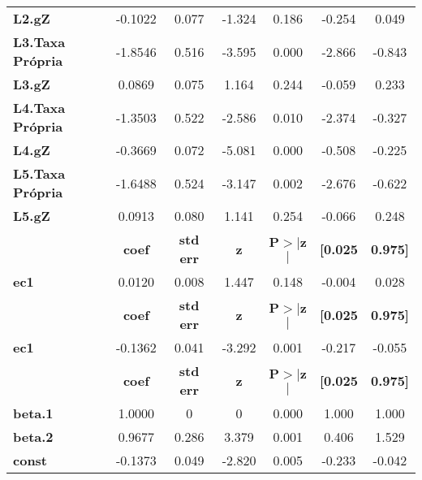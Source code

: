 \begin{center}
\begin{tabular}{lcccccc}
\textbf{L2.gZ}           &      -0.1022  &        0.077     &    -1.324  &         0.186        &       -0.254    &        0.049     \\
\textbf{L3.Taxa Própria} &      -1.8546  &        0.516     &    -3.595  &         0.000        &       -2.866    &       -0.843     \\
\textbf{L3.gZ}           &       0.0869  &        0.075     &     1.164  &         0.244        &       -0.059    &        0.233     \\
\textbf{L4.Taxa Própria} &      -1.3503  &        0.522     &    -2.586  &         0.010        &       -2.374    &       -0.327     \\
\textbf{L4.gZ}           &      -0.3669  &        0.072     &    -5.081  &         0.000        &       -0.508    &       -0.225     \\
\textbf{L5.Taxa Própria} &      -1.6488  &        0.524     &    -3.147  &         0.002        &       -2.676    &       -0.622     \\
\textbf{L5.gZ}           &       0.0913  &        0.080     &     1.141  &         0.254        &       -0.066    &        0.248     \\
             & \textbf{coef} & \textbf{std err} & \textbf{z} & \textbf{P$> |$z$|$} & \textbf{[0.025} & \textbf{0.975]}  \\
\midrule
\textbf{ec1} &       0.0120  &        0.008     &     1.447  &         0.148        &       -0.004    &        0.028     \\
             & \textbf{coef} & \textbf{std err} & \textbf{z} & \textbf{P$> |$z$|$} & \textbf{[0.025} & \textbf{0.975]}  \\
\midrule
\textbf{ec1} &      -0.1362  &        0.041     &    -3.292  &         0.001        &       -0.217    &       -0.055     \\
                & \textbf{coef} & \textbf{std err} & \textbf{z} & \textbf{P$> |$z$|$} & \textbf{[0.025} & \textbf{0.975]}  \\
\midrule
\textbf{beta.1} &       1.0000  &            0     &         0  &         0.000        &        1.000    &        1.000     \\
\textbf{beta.2} &       0.9677  &        0.286     &     3.379  &         0.001        &        0.406    &        1.529     \\
\textbf{const}  &      -0.1373  &        0.049     &    -2.820  &         0.005        &       -0.233    &       -0.042     \\
\bottomrule
\end{tabular}
\end{center}